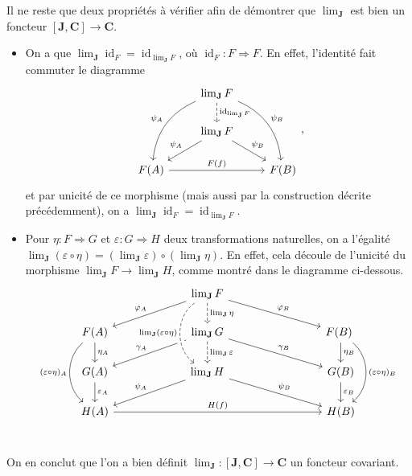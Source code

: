 \documentclass{../../td}
\newcommand\id{\ensuremath{\operatorname{id}}}
\begin{document}
  Il ne reste que deux propriétés à vérifier afin de démontrer que $\lim_\mathbf{J}$ est bien un foncteur $[\mathbf{J}, \mathbf{C}] \to \mathbf{C}$.

  \begin{itemize}
    \item On a que $\lim_\mathbf{J} \id_F = \id_{\lim_\mathbf{J} F}$, où $\id_F : F \Rightarrow F$.
      En effet, l'identité fait commuter le diagramme
      \[
      \begin{tikzcd}
          & \lim_\mathbf{J} F \arrow[dashed]{d}{\id_{\lim_\mathbf{J} F}} \arrow[bend right,swap]{ddl}{\psi_A} \arrow[bend left]{ddr}{\psi_B}\\
          & \lim_\mathbf{J} F \arrow[swap]{dl}{\psi_A} \arrow{dr}{\psi_B}\\
          F(A) \arrow{rr}{F(f)} & & F(B)
      \end{tikzcd}
      ,\] 
      et par unicité de ce morphisme (mais aussi par la construction décrite précédemment), on a $\lim_\mathbf{J} \id_F = \id_{\lim_\mathbf{J} F}$.
    \item Pour $\eta : F \Rightarrow G$ et $\varepsilon : G \Rightarrow H$ deux transformations naturelles, on a l'égalité $\lim_\mathbf{J} (\varepsilon \circ \eta) = (\lim_\mathbf{J} \varepsilon)\circ(\lim_\mathbf{J} \eta)$.
      En effet, cela découle de l'unicité du morphisme $\lim_\mathbf{J} F \to \lim_\mathbf{J} H$, comme montré dans le diagramme ci-dessous.
      \[
      \begin{tikzcd}[column sep={100,between origins}]
          & \lim_\mathbf{J} F \arrow[dashed]{d}{\lim_\mathbf{J} \eta} \arrow[swap]{dl}{\varphi_A} \arrow{dr}{\varphi_B} \\
          F(A)\arrow{d}{\eta_A}\arrow[bend right=50, swap]{dd}{(\varepsilon\circ\eta)_A}& \lim_\mathbf{J} G \arrow[dashed]{d}{\lim_\mathbf{J} \varepsilon} \arrow[swap]{dl}{\gamma_A} \arrow{dr}{\gamma_B} & F(B)\arrow{d}{\eta_B} \arrow[bend left=50]{dd}{(\varepsilon\circ\eta)_B}\\
          G(A)\arrow{d}{\varepsilon_A}& \lim_\mathbf{J} H \arrow[swap]{dl}{\psi_A} \arrow{dr}{\psi_B} & G(B)\arrow{d}{\varepsilon_B}\\
          H(A) \arrow{rr}{H(f)} & & H(B)
          \arrow[from=1-2,to=3-2,dashed,bend right=55,crossing over, swap]{dd}{\lim_\mathbf{J}(\varepsilon\circ\eta)}\\
      \end{tikzcd}
      \] 
  \end{itemize}

  On en conclut que l'on a bien définit $\lim_\mathbf{J} : [\mathbf{J}, \mathbf{C}] \to \mathbf{C}$ un foncteur covariant.
\end{document}
